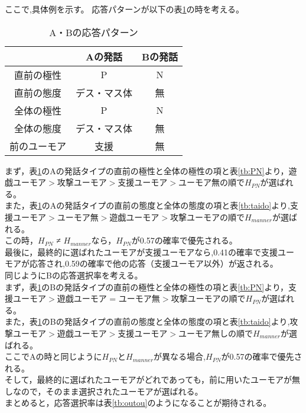 ここで,具体例を示す。
応答パターンが以下の表\ref{tb:hatuwa}の時を考える。


\begin{table}[tb]
\begin{center}
\caption{A・Bの応答パターン}
\label{tb:hatuwa}
\begin{tabular}{|c|c|c|}
\hline
 & Aの発話 & Bの発話 \\
\hline
直前の極性 & P & N \\
\hline
直前の態度 & デス・マス体 & 無 \\
\hline
全体の極性 & P & N \\
\hline
全体の態度 & デス・マス体 & 無 \\
\hline
前のユーモア & 支援 & 無 \\
\hline
\end{tabular}
\end{center}
\end{table}


まず，表\ref{tb:hatuwa}のAの発話タイプの直前の極性と全体の極性の項と表\ref{tb:PN}より，遊戯ユーモア$>$攻撃ユーモア$>$支援ユーモア$>$ユーモア無の順で$H_{PN}$が選ばれる。\\
\hspace{1zw}また，表\ref{tb:hatuwa}のAの発話タイプの直前の態度と全体の態度の項と表\ref{tb:taido}より,支援ユーモア$>$ユーモア無$>$遊戯ユーモア$>$攻撃ユーモアの順で$H_{manner}$が選ばれる。\\
\hspace{1zw}この時，$H_{PN}$ ≠ $H_{manner}$なら，$H_{PN}$が0.57の確率で優先される。\\
最後に，最終的に選ばれたユーモアが支援ユーモアなら,0.41の確率で支援ユーモアが応答され,0.59の確率で他の応答（支援ユーモア以外）が返される。\\
\hspace{1zw}同じようにBの応答選択率を考える。\\
\hspace{1zw}まず，表\ref{tb:hatuwa}のBの発話タイプの直前の極性と全体の極性の項と表\ref{tb:PN}より，支援ユーモア$>$遊戯ユーモア = ユーモア無$>$攻撃ユーモアの順で$H_{PN}$が選ばれる。\\
\hspace{1zw}また，表\ref{tb:hatuwa}のBの発話タイプの直前の態度と全体の態度の項と表\ref{tb:taido}より,攻撃ユーモア$>$遊戯ユーモア$>$支援ユーモア$>$ユーモア無しの順で$H_{manner}$が選ばれる。\\
\hspace{1zw}ここでAの時と同じように$H_{PN}$と$H_{manner}$が異なる場合,$H_{PN}$が0.57の確率で優先される。\\
\hspace{1zw}そして，最終的に選ばれたユーモアがどれであっても，前に用いたユーモアが無しなので，そのまま選択されたユーモアが選ばれる。\\
\hspace{1zw}まとめると，応答選択率は表\ref{tb:outou}のようになることが期待される。

